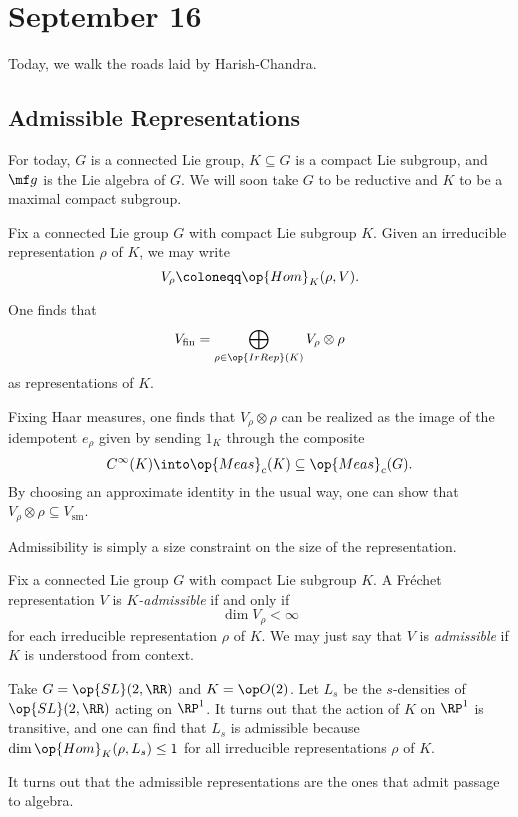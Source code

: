\documentclass[../notes.tex]{subfiles}
\begin{document}
\section{September 16}
Today, we walk the roads laid by Harish-Chandra.

\subsection{Admissible Representations}
For today, $G$ is a connected Lie group, $K\subseteq G$ is a compact Lie subgroup, and $\mf g$ is the Lie algebra of $G$. We will soon take $G$ to be reductive and $K$ to be a maximal compact subgroup.
\begin{notation}
	Fix a connected Lie group $G$ with compact Lie subgroup $K$. Given an irreducible representation $\rho$ of $K$, we may write
	\[V_\rho\coloneqq\op{Hom}_K(\rho,V).\]
\end{notation}
\begin{remark}
	One finds that
	\[V_{\mathrm{fin}}=\bigoplus_{\rho\in\op{IrRep}(K)}V_\rho\otimes\rho\]
	as representations of $K$.
\end{remark}
\begin{remark}
	Fixing Haar measures, one finds that $V_\rho\otimes\rho$ can be realized as the image of the idempotent $e_\rho$ given by sending $1_K$ through the composite
	\[C^\infty(K)\into\op{Meas}_c(K)\subseteq\op{Meas}_c(G).\]
	By choosing an approximate identity in the usual way, one can show that $V_\rho\otimes\rho\subseteq V_{\mathrm{sm}}$.
\end{remark}
Admissibility is simply a size constraint on the size of the representation.
\begin{definition}[admissible]
	Fix a connected Lie group $G$ with compact Lie subgroup $K$. A Fr\'echet representation $V$ is \textit{$K$-admissible} if and only if
	\[\dim V_\rho<\infty\]
	for each irreducible representation $\rho$ of $K$. We may just say that $V$ is \textit{admissible} if $K$ is understood from context.
\end{definition}
\begin{example}
	Take $G=\op{SL}(2,\RR)$ and $K=\op O(2)$. Let $L_s$ be the $s$-densities of $\op{SL}(2,\RR)$ acting on $\RP^1$. It turns out that the action of $K$ on $\RP^1$ is transitive, and one can find that $L_s$ is admissible because $\dim\op{Hom}_K(\rho,L_s)\le1$ for all irreducible representations $\rho$ of $K$.
\end{example}
It turns out that the admissible representations are the ones that admit passage to algebra.
\end{document}
